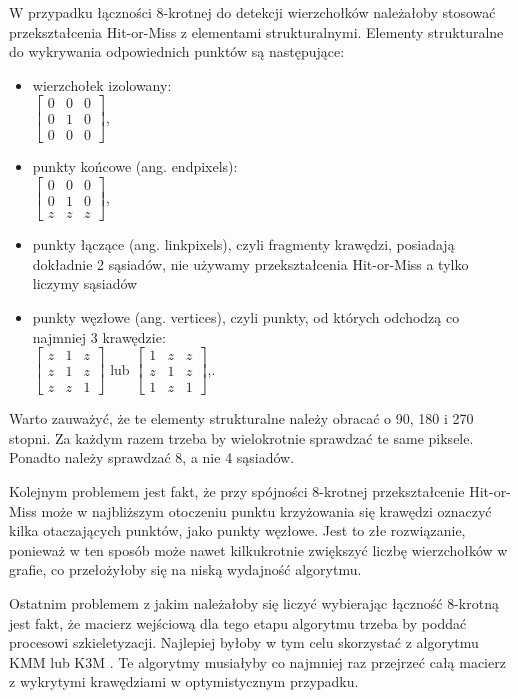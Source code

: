 \documentclass[a4paper,11pt,twoside,openright]{report}
\theoremstyle{definition}
\begin{document}
W przypadku łączności 8-krotnej do detekcji wierzchołków należałoby stosować
przekształcenia Hit-or-Miss z elementami strukturalnymi. Elementy strukturalne
do wykrywania odpowiednich punktów są następujące:
\begin{itemize}%
\item wierzchołek izolowany: \\
$
\begin{bmatrix}
0 & 0 & 0 \\
0 & 1 & 0 \\
0 & 0 & 0
\end{bmatrix}
$,
\item punkty końcowe (ang. endpixels): \\
$
\begin{bmatrix}
0 & 0 & 0 \\
0 & 1 & 0 \\
z & z & z
\end{bmatrix}
$,
\item punkty łączące (ang. linkpixels), czyli fragmenty krawędzi, posiadają
dokładnie 2 sąsiadów, nie używamy przekształcenia Hit-or-Miss a tylko liczymy sąsiadów
\item punkty węzłowe (ang. vertices), czyli punkty, od których odchodzą co najmniej 3 krawędzie: \\
$
\begin{bmatrix}
z & 1 & z \\
z & 1 & z \\
z & z & 1
\end{bmatrix}
$ lub $
\begin{bmatrix}
1 & z & z \\
z & 1 & z \\
1 & z & 1
\end{bmatrix}
$,.
\end{itemize}

Warto zauważyć, że te elementy strukturalne należy obracać o 90, 180 i 270 stopni.
Za każdym razem trzeba by wielokrotnie sprawdzać te same piksele. Ponadto należy
sprawdzać 8, a nie 4 sąsiadów.

Kolejnym problemem jest fakt, że przy spójności 8-krotnej przekształcenie
Hit-or-Miss może w najbliższym otoczeniu punktu krzyżowania się krawędzi oznaczyć
kilka otaczających punktów, jako punkty węzłowe. Jest to złe rozwiązanie, ponieważ
w ten sposób może nawet kilkukrotnie zwiększyć liczbę wierzchołków w grafie, co
przełożyłoby się na niską wydajność algorytmu.

Ostatnim problemem z jakim należałoby się liczyć wybierając łączność 8-krotną
jest fakt, że macierz wejściową dla tego etapu algorytmu trzeba by poddać procesowi
szkieletyzacji. Najlepiej byłoby w tym celu skorzystać z algorytmu KMM \cite{KMM}
lub K3M \cite{K3M}. Te algorytmy musiałyby co najmniej raz przejrzeć całą macierz
z wykrytymi krawędziami w optymistycznym przypadku.
\end{document}
